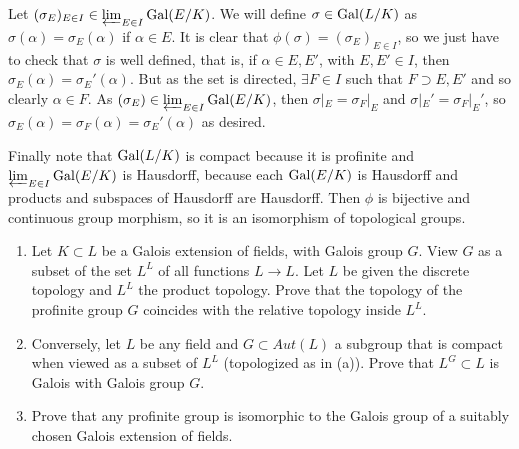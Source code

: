 \begin{sol}
	Let $(\sigma_E)_{E \in I} \in \varprojlim_{E \in I} \mathrm{Gal}(E/K)$. We will define $\sigma \in \mathrm{Gal}(L/K)$ as $\sigma(\alpha) = \sigma_E(\alpha)$ if $\alpha \in E$. It is clear that $\phi(\sigma) = (\sigma_E)_{E \in I}$, so we just have to check that $\sigma$ is well defined, that is, if $\alpha \in E, E'$, with $E, E' \in I$, then $\sigma_E(\alpha) = \sigma_E'(\alpha)$. But as the set is directed, $\exists F \in I$ such that $F \supset E, E'$ and so clearly $\alpha \in F$. As $(\sigma_E) \in \varprojlim_{E \in I} \mathrm{Gal}(E/K)$, then $\sigma|_E = \sigma_F|_E$ and $\sigma|_E' = \sigma_F|_E'$, so $\sigma_E(\alpha) = \sigma_F(\alpha) = \sigma_E'(\alpha)$ as desired.

	Finally note that $\mathrm{Gal}(L/K)$ is compact because it is profinite and $\varprojlim_{E \in I} \mathrm{Gal}(E/K)$ is Hausdorff, because each $\mathrm{Gal}(E/K)$ is Hausdorff and products and subspaces of Hausdorff are Hausdorff. Then $\phi$ is bijective and continuous group morphism, so it is an isomorphism of topological groups.

\end{sol}

\begin{ex}
	\begin{enumerate}[label=\alph*)]
		\item Let $K \subset L$ be a Galois extension of fields, with Galois group $G$. View $G$ as a subset of the set $L^L$ of all functions $L \to L$. Let $L$ be given the discrete topology and $L^L$ the product topology. Prove that the topology of the profinite group $G$ coincides with the relative topology inside $L^L$.

		\item Conversely, let $L$ be any field and $G \subset Aut(L)$ a subgroup that is compact when viewed as a subset of $L^L$ (topologized as in (a)). Prove that $L^G \subset L$ is Galois with Galois group $G$.

		\item Prove that any profinite group is isomorphic to the Galois group of a suitably chosen Galois extension of fields.
	\end{enumerate}
\end{ex}

